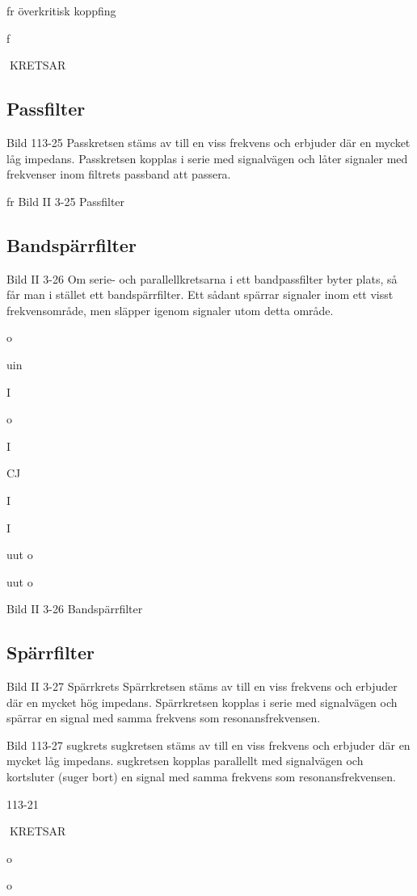 {fr
överkritisk koppfing

f

KRETSAR
\subsection{Passfilter}

Bild 113-25
Passkretsen stäms av till en viss frekvens
och erbjuder där en mycket låg impedans.
Passkretsen kopplas i serie med signalvägen och låter signaler med frekvenser inom
filtrets passband att passera.

fr
Bild II 3-25 Passfilter

\subsection{Bandspärrfilter}

Bild II 3-26
Om serie- och parallellkretsarna i ett bandpassfilter byter plats, så får man i stället ett
bandspärrfilter. Ett sådant spärrar signaler
inom ett visst frekvensområde, men släpper
igenom signaler utom detta område.

o

uin

I

o

I

CJ

I

I

uut
o

uut
o

Bild II 3-26 Bandspärrfilter

\subsection{Spärrfilter}

Bild II 3-27
Spärrkrets
Spärrkretsen stäms av till en viss frekvens
och erbjuder där en mycket hög impedans.
Spärrkretsen kopplas i serie med signalvägen och spärrar en signal med samma
frekvens som resonansfrekvensen.

Bild 113-27
sugkrets
sugkretsen stäms av till en viss frekvens och
erbjuder där en mycket låg impedans. sugkretsen kopplas parallellt med signalvägen
och kortsluter (suger bort) en signal med
samma frekvens som resonansfrekvensen.

113-21

KRETSAR

o

o

}
